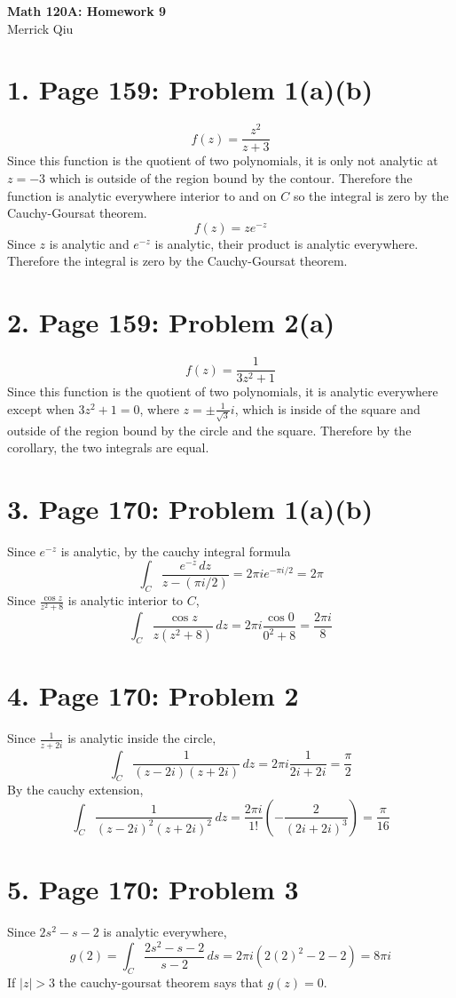 \documentclass{article}
\begin{document}
\begin{center}
	\huge{\bf Math 120A: Homework 9} \\
	Merrick Qiu
\end{center}
\section*{1. Page 159: Problem 1(a)(b)}
\[
	f(z) = \frac{z^2}{z+3}
\]
Since this function is the quotient of two polynomials,
it is only not analytic at $z=-3$ which is outside of the 
region bound by the contour.
Therefore the function is analytic everywhere interior to 
and on $C$ so the integral is zero by the Cauchy-Goursat theorem.
\[
	f(z) = ze^{-z}
\]
Since $z$ is analytic and $e^{-z}$ is analytic,
their product is analytic everywhere.
Therefore the integral is zero by the Cauchy-Goursat theorem.
\newpage
\section*{2. Page 159: Problem 2(a)}
\[
	f(z) = \frac{1}{3z^2+1}
\]
Since this function is the quotient of two polynomials,
it is analytic everywhere except when $3z^2+1 = 0$, where 
$z = \pm \frac{1}{\sqrt{3}}i$, which is inside of the square
and outside of the region bound by the circle and the square.
Therefore by the corollary, the two integrals are equal.
\newpage 

\section*{3. Page 170: Problem 1(a)(b)}
Since $e^{-z}$ is analytic, by the cauchy integral formula
\[
	\int_C \frac{e^{-z} \,dz}{z-(\pi i/2)} = 2\pi i e^{-\pi i/2} = 2\pi
\]
Since $\frac{\cos z}{z^2+8}$ is analytic interior to $C$,
\[
	\int_C \frac{\cos z}{z(z^2+8)} \,dz =  2\pi i \frac{\cos 0}{0^2+8} = \frac{2\pi i}{8}
\]
\newpage 

\section*{4. Page 170: Problem 2}
Since $\frac{1}{z+2i}$ is analytic inside the circle,
\[
	\int_C \frac{1}{(z-2i)(z+2i)}\,dz = 2\pi i \frac{1}{2i+2i} = \frac{\pi}{2}
\]
By the cauchy extension,
\[
	\int_C \frac{1}{(z-2i)^2(z+2i)^2}\,dz = \frac{2\pi i}{1!} \left(-\frac{2}{(2i+2i)^3}\right) = \frac{\pi}{16}
\]
\newpage 
\section*{5. Page 170: Problem 3}
Since $2s^2-s-2$ is analytic everywhere,
\[
	g(2) = \int_C \frac{2s^2-s-2}{s-2} \,ds = 2\pi i (2(2)^2 - 2 - 2) = 8\pi i
\]
If $|z| > 3$ the cauchy-goursat theorem says that $g(z) = 0$.
\end{document}
